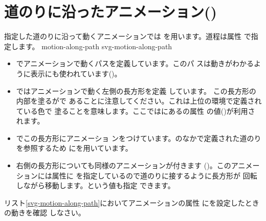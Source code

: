 \section{道のりに沿ったアニメーション()}
指定した道のりに沿って動くアニメーションでは
を用います。道程は属性 で指定します。
{motion-along-path}
   {svg-motion-along-path}
\begin{itemize}
 \item {}でアニメーションで動くパスを定義しています。このパ
       スは動きがわかるように表示にも使われています()。
 \item {}ではアニメーションで動く左側の長方形を定義
       しています。
       この長方形の内部を塗るがで
       あることに注意してください。これは上位の環境で定義されている色で
       塗ることを意味します。ここではにあるの属性
       の値()が利用されます。
 \item {}でこの長方形にアニメーショ
       ンをつけています。のなかで定義された道のりを参照するため
       にを用いています。
 \item 右側の長方形についても同様のアニメーションが付きます
       ()。このアニメーションには属性に
       を指定しているので道のりに接するように長方形が
       回転しながら移動します。という値も指定
       できます。
\end{itemize}
\begin{Problem}\upshape
 リスト\ref{svg-motion-along-path}においてアニメーションの属性
 にを設定したときの動きを確認
 しなさい。
\end{Problem}
